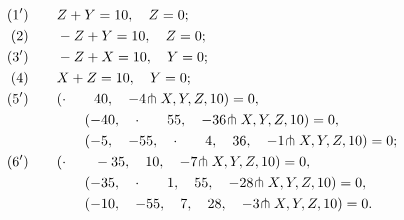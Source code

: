 \documentclass[11pt,a4paper]{article}
\begin{document}
\begin{align*}
(1')\qquad &Z+Y=10,\quad Z=0;\\
(2)\qquad &-Z+Y=10,\quad Z=0;\\
(3')\qquad &-Z+X=10,\quad Y=0;\\
(4)\qquad &X+Z=10,\quad Y=0;\\
(5')\qquad &(\cdot\qquad 40,\quad -4\hspace{-0.2em}\pitchfork X, Y, Z, 10) = 0,\\
&\qquad(-40,\quad \cdot\qquad 55,\quad -36\hspace{-0.2em}\pitchfork X, Y, Z, 10) = 0,\\
&\qquad(-5,\quad -55,\quad \cdot\qquad 4,\quad 36,\quad -1\hspace{-0.2em}\pitchfork X, Y, Z, 10) = 0;\\
(6')\qquad &(\cdot\qquad -35,\quad 10,\quad -7\hspace{-0.2em}\pitchfork X, Y, Z, 10) = 0,\\
&\qquad(-35,\quad \cdot\qquad 1,\quad 55,\quad -28\hspace{-0.2em}\pitchfork X, Y, Z, 10) = 0,\\
&\qquad(-10,\quad -55,\quad 7,\quad 28,\quad -3\hspace{-0.2em}\pitchfork X, Y, Z, 10) = 0.
\end{align*}

\newpage
\setcounter{page}{328}
\end{document}
